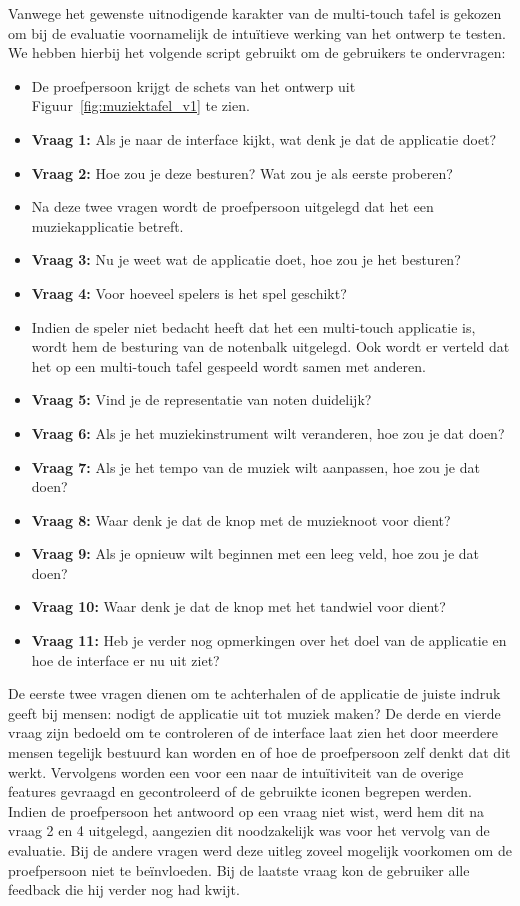 \documentclass{acm}
\begin{document}
Vanwege het gewenste uitnodigende karakter van de multi-touch tafel is gekozen om bij de evaluatie voornamelijk de intuïtieve werking van het ontwerp te testen. We hebben hierbij het volgende script gebruikt om de gebruikers te ondervragen:

\begin{itemize}
  \item De proefpersoon krijgt de schets van het ontwerp uit Figuur~\ref{fig:muziektafel_v1} te zien.
  \item \textbf{Vraag 1:} Als je naar de interface kijkt, wat denk je dat de applicatie doet?
  \item \textbf{Vraag 2:} Hoe zou je deze besturen? Wat zou je als eerste proberen?
  \item Na deze twee vragen wordt de proefpersoon uitgelegd dat het een muziekapplicatie betreft.
  \item \textbf{Vraag 3:} Nu je weet wat de applicatie doet, hoe zou je het besturen?
  \item \textbf{Vraag 4:} Voor hoeveel spelers is het spel geschikt?
  \item Indien de speler niet bedacht heeft dat het een multi-touch applicatie is, wordt hem de besturing van de notenbalk uitgelegd. Ook wordt er verteld dat het op een multi-touch tafel gespeeld wordt samen met anderen.
  \item \textbf{Vraag 5:} Vind je de representatie van noten duidelijk?
  \item \textbf{Vraag 6:} Als je het muziekinstrument wilt veranderen, hoe zou je dat doen?
  \item \textbf{Vraag 7:} Als je het tempo van de muziek wilt aanpassen, hoe zou je dat doen?
  \item \textbf{Vraag 8:} Waar denk je dat de knop met de muzieknoot voor dient?
  \item \textbf{Vraag 9:} Als je opnieuw wilt beginnen met een leeg veld, hoe zou je dat doen?
  \item \textbf{Vraag 10:} Waar denk je dat de knop met het tandwiel voor dient?
  \item \textbf{Vraag 11:} Heb je verder nog opmerkingen over het doel van de applicatie en hoe de interface er nu uit ziet?
\end{itemize}

De eerste twee vragen dienen om te achterhalen of de applicatie de juiste indruk geeft bij mensen: nodigt de applicatie uit tot muziek maken? De derde en vierde vraag zijn bedoeld om te controleren of de interface laat zien het door meerdere mensen tegelijk bestuurd kan worden en of hoe de proefpersoon zelf denkt dat dit werkt. Vervolgens worden een voor een naar de intuïtiviteit van de overige features gevraagd en gecontroleerd of de gebruikte iconen begrepen werden. Indien de proefpersoon het antwoord op een vraag niet wist, werd hem dit na vraag 2 en 4 uitgelegd, aangezien dit noodzakelijk was voor het vervolg van de evaluatie. Bij de andere vragen werd deze uitleg zoveel mogelijk voorkomen om de proefpersoon niet te beïnvloeden. Bij de laatste vraag kon de gebruiker alle feedback die hij verder nog had kwijt.
\end{document}
